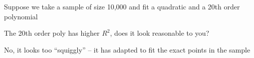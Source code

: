 \documentclass[11pt,english,handout]{beamer}
\newenvironment{wideitemize}{\itemize\addtolength{\itemsep}{10pt}}{\enditemize}
\begin{document}
\begin{frame}
	
	\begin{figure}
		  
	\end{figure}
	
	\begin{wideitemize}
		\item
		Suppose we take a sample of size 10,000 and fit a quadratic and a 20th order polynomial
		
		\pause
		\item
		The 20th order poly has higher $R^2$, does it look reasonable to you? 
		
		\pause
		\item
		No, it looks too ``squiggly'' -- it has adapted to fit the exact points in the sample
	\end{wideitemize}
\end{frame}
\end{document}
